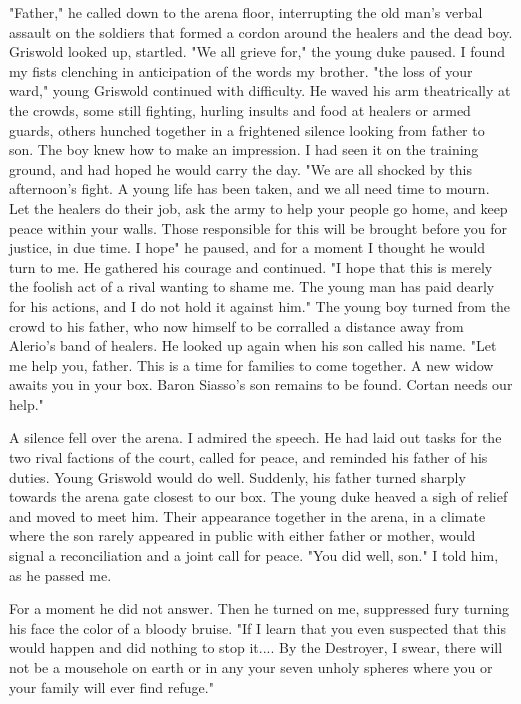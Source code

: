 \documentclass{article}
\begin{document}
"Father," he called down to the arena floor, interrupting the old man's verbal assault on the soldiers that formed a cordon around the healers and the dead boy. Griswold looked up, startled. "We all grieve for," the young duke paused. I found my fists clenching in anticipation of the words my brother. "the loss of your ward," young Griswold continued with difficulty. He waved his arm theatrically at the crowds, some still fighting, hurling insults and food at healers or armed guards, others hunched together in a frightened silence looking from father to son. The boy knew how to make an impression. I had seen it on the training ground, and had hoped he would carry the day. "We are all shocked by this afternoon's fight. A young life has been taken, and we all need time to mourn. Let the healers do their job, ask the army to help your people go home, and keep peace within your walls. Those responsible for this will be brought before you for justice, in due time. I hope" he paused, and for a moment I thought he would turn to me. He gathered his courage and continued. "I hope that this is merely the foolish act of a rival wanting to shame me. The young man has paid dearly for his actions, and I do not hold it against him." The young boy turned from the crowd to his father, who now himself to be corralled a distance away from Alerio's band of healers. He looked up again when his son called his name. "Let me help you, father. This is a time for families to come together. A new widow awaits you in your box. Baron Siasso's son remains to be found. Cortan needs our help."

A silence fell over the arena. I admired the speech. He had laid out tasks for the two rival factions of the court, called for peace, and reminded his father of his duties. Young Griswold would do well. Suddenly, his father turned sharply towards the arena gate closest to our box. The young duke heaved a sigh of relief and moved to meet him. Their appearance together in the arena, in a climate where the son rarely appeared in public with either father or mother, would signal a reconciliation and a joint call for peace. "You did well, son." I told him, as he passed me.

For a moment he did not answer. Then he turned on me, suppressed fury turning his face the color of a bloody bruise. "If I learn that you even suspected that this would happen and did nothing to stop it.... By the Destroyer, I swear, there will not be a mousehole on earth or in any your seven unholy spheres where you or your family will ever find refuge."
\end{document}
